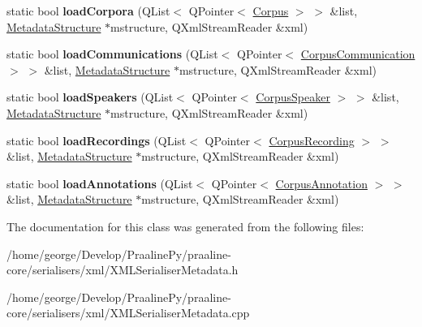 \begin{DoxyCompactItemize}
\item 
\mbox{\label{class_x_m_l_serialiser_metadata_a7093a4132def8585db18ccc8d6878052}} 
static bool {\bfseries load\+Corpora} (Q\+List$<$ Q\+Pointer$<$ \hyperlink{class_corpus}{Corpus} $>$ $>$ \&list, \hyperlink{class_metadata_structure}{Metadata\+Structure} $\ast$mstructure, Q\+Xml\+Stream\+Reader \&xml)
\item 
\mbox{\label{class_x_m_l_serialiser_metadata_abd1053f2b2437b483e584fe09fe4adce}} 
static bool {\bfseries load\+Communications} (Q\+List$<$ Q\+Pointer$<$ \hyperlink{class_corpus_communication}{Corpus\+Communication} $>$ $>$ \&list, \hyperlink{class_metadata_structure}{Metadata\+Structure} $\ast$mstructure, Q\+Xml\+Stream\+Reader \&xml)
\item 
\mbox{\label{class_x_m_l_serialiser_metadata_a4f0892c955c28fbe7e1d22da6929e20a}} 
static bool {\bfseries load\+Speakers} (Q\+List$<$ Q\+Pointer$<$ \hyperlink{class_corpus_speaker}{Corpus\+Speaker} $>$ $>$ \&list, \hyperlink{class_metadata_structure}{Metadata\+Structure} $\ast$mstructure, Q\+Xml\+Stream\+Reader \&xml)
\item 
\mbox{\label{class_x_m_l_serialiser_metadata_a34e9a5588ad88854acfdfbd843473c3b}} 
static bool {\bfseries load\+Recordings} (Q\+List$<$ Q\+Pointer$<$ \hyperlink{class_corpus_recording}{Corpus\+Recording} $>$ $>$ \&list, \hyperlink{class_metadata_structure}{Metadata\+Structure} $\ast$mstructure, Q\+Xml\+Stream\+Reader \&xml)
\item 
\mbox{\label{class_x_m_l_serialiser_metadata_aa5173d86ad97e5fdcd7a61abc8b04857}} 
static bool {\bfseries load\+Annotations} (Q\+List$<$ Q\+Pointer$<$ \hyperlink{class_corpus_annotation}{Corpus\+Annotation} $>$ $>$ \&list, \hyperlink{class_metadata_structure}{Metadata\+Structure} $\ast$mstructure, Q\+Xml\+Stream\+Reader \&xml)
\end{DoxyCompactItemize}


The documentation for this class was generated from the following files\+:\begin{DoxyCompactItemize}
\item 
/home/george/\+Develop/\+Praaline\+Py/praaline-\/core/serialisers/xml/X\+M\+L\+Serialiser\+Metadata.\+h\item 
/home/george/\+Develop/\+Praaline\+Py/praaline-\/core/serialisers/xml/X\+M\+L\+Serialiser\+Metadata.\+cpp\end{DoxyCompactItemize}
